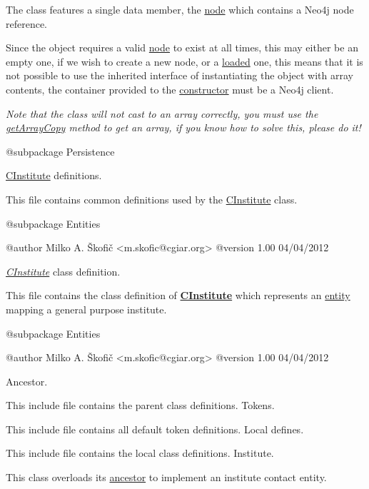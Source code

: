The class features a single data member, the \hyperlink{}{node} which contains a Neo4j node reference.

Since the object requires a valid \hyperlink{}{node} to exist at all times, this may either be an empty one, if we wish to create a new node, or a \hyperlink{}{loaded} one, this means that it is not possible to use the inherited interface of instantiating the object with array contents, the container provided to the \hyperlink{}{constructor} must be a Neo4j client.

{\itshape Note that the class will not cast to an array correctly, you must use the \hyperlink{}{get\-Array\-Copy} method to get an array, if you know how to solve this, please do it!}

\begin{DoxyVerb}    @subpackage     Persistence\end{DoxyVerb}


\hyperlink{class_c_institute}{C\-Institute} definitions.

This file contains common definitions used by the \hyperlink{class_c_institute}{C\-Institute} class.

\begin{DoxyVerb}    @subpackage     Entities

    @author         Milko A. Škofič <m.skofic@cgiar.org>
    @version        1.00 04/04/2012\end{DoxyVerb}


{\itshape \hyperlink{class_c_institute}{C\-Institute}} class definition.

This file contains the class definition of {\bfseries \hyperlink{class_c_institute}{C\-Institute}} which represents an \hyperlink{class_c_entity}{entity} mapping a general purpose institute.

\begin{DoxyVerb}    @subpackage     Entities

    @author         Milko A. Škofič <m.skofic@cgiar.org>
    @version        1.00 04/04/2012\end{DoxyVerb}


Ancestor.

This include file contains the parent class definitions. Tokens.

This include file contains all default token definitions. Local defines.

This include file contains the local class definitions. Institute.

This class overloads its \hyperlink{class_c_contact}{ancestor} to implement an institute contact entity.

